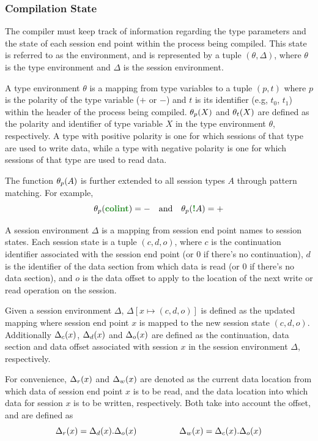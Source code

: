 \documentclass[sigconf,nonacm,natbib=true]{acmart}
\begin{document}
\subsubsection{Compilation State}

The compiler must keep track of information regarding the type parameters and the state of each session end point within the process being compiled. This state is referred to as the environment, and is represented by a tuple $(\theta, \Delta)$, where $\theta$ is the type environment and $\Delta$ is the session environment.

A type environment $\theta$ is a mapping from type variables to a tuple $(p, t)$ where $p$ is the polarity of the type variable ($+$ or $-$) and $t$ is its identifier (e.g, $t_0$, $t_1$) within the header of the process being compiled. $\theta_{p}(X)$ and $\theta_{t}(X)$ are defined as the polarity and identifier of type variable $X$ in the type environment $\theta$, respectively. A type with positive polarity is one for which sessions of that type are used to write data, while a type with negative polarity is one for which sessions of that type are used to read data.

The function $\theta_{p}(A)$ is further extended to all session types $A$ through pattern matching. For example, \[\polarityof{\theta}{\colintt} = - \quad\text{and}\quad \polarityof{\theta}{\bangt{A}} = +\]

A session environment $\Delta$ is a mapping from session end point names to session states. Each session state is a tuple $(c, d, o)$, where $c$ is the continuation identifier associated with the session end point (or $0$ if there's no continuation), $d$ is the identifier of the data section from which data is read (or $0$ if there's no data section), and $o$ is the data offset to apply to the location of the next write or read operation on the session.

Given a session environment $\Delta$, $\Delta[x \mapsto (c, d, o)]$ is defined as the updated mapping where session end point $x$ is mapped to the new session state $(c, d, o)$. Additionally $\Delta_c(x)$, $\Delta_d(x)$ and $\Delta_o(x)$ are defined as the continuation, data section and data offset associated with session $x$ in the session environment $\Delta$, respectively.

For convenience, $\Delta_r(x)$ and $\Delta_w(x)$ are denoted as the current data location from which data of session end point $x$ is to be read, and the data location into which data for session $x$ is to be written, respectively. Both take into account the offset, and are defined as \[\Delta_r(x) = \Delta_d(x).\Delta_o(x) \hspace{5em} \Delta_w(x) = \Delta_c(x).\Delta_o(x)\]
\end{document}
